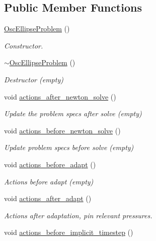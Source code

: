\subsection*{Public Member Functions}
\begin{DoxyCompactItemize}
\item 
\hyperlink{classOscEllipseProblem_aaa836937ec963921243fcb990f6fe538}{Osc\+Ellipse\+Problem} ()
\begin{DoxyCompactList}\small\item\em Constructor. \end{DoxyCompactList}\item 
\hyperlink{classOscEllipseProblem_a48a38acb7db1b394f7bfcd02e779b795}{$\sim$\+Osc\+Ellipse\+Problem} ()
\begin{DoxyCompactList}\small\item\em Destructor (empty) \end{DoxyCompactList}\item 
void \hyperlink{classOscEllipseProblem_a268e14b24e3ac922e7362bbb37ccde1f}{actions\+\_\+after\+\_\+newton\+\_\+solve} ()
\begin{DoxyCompactList}\small\item\em Update the problem specs after solve (empty) \end{DoxyCompactList}\item 
void \hyperlink{classOscEllipseProblem_a18bbd70aa8c140637637053a5f839c11}{actions\+\_\+before\+\_\+newton\+\_\+solve} ()
\begin{DoxyCompactList}\small\item\em Update problem specs before solve (empty) \end{DoxyCompactList}\item 
void \hyperlink{classOscEllipseProblem_a97c1b0056acbb9a6ec6157b6e7ad258a}{actions\+\_\+before\+\_\+adapt} ()
\begin{DoxyCompactList}\small\item\em Actions before adapt (empty) \end{DoxyCompactList}\item 
void \hyperlink{classOscEllipseProblem_a6044661f75986848484df2c04bfe7aab}{actions\+\_\+after\+\_\+adapt} ()
\begin{DoxyCompactList}\small\item\em Actions after adaptation, pin relevant pressures. \end{DoxyCompactList}\item 
void \hyperlink{classOscEllipseProblem_a7b12b4fdfcb46c3f00885f0a1f9965b3}{actions\+\_\+before\+\_\+implicit\+\_\+timestep} ()

\end{DoxyCompactItemize}
